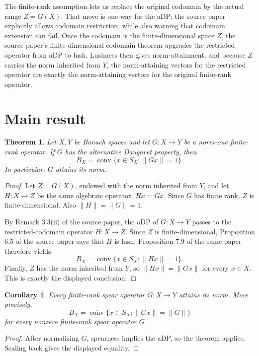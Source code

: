 \documentclass[11pt]{article}
\newtheorem{theorem}{Theorem}
\newtheorem{corollary}{Corollary}
\newcommand{\conv}{\operatorname{conv}}
\begin{document}
The finite-rank assumption lets us replace the original codomain by the
actual range \(Z=G(X)\).  That move is one-way for the aDP: the source
paper explicitly allows codomain restriction, while also warning that
codomain extension can fail.  Once the codomain is the finite-dimensional
space \(Z\), the source paper's finite-dimensional codomain theorem
upgrades the restricted operator from aDP to lush.  Lushness then gives
norm-attainment, and because \(Z\) carries the norm inherited from \(Y\),
the norm-attaining vectors for the restricted operator are exactly the
norm-attaining vectors for the original finite-rank operator.

\section*{Main result}

\begin{theorem}
Let \(X,Y\) be Banach spaces and let \(G:X\to Y\) be a norm-one
finite-rank operator.  If \(G\) has the alternative Daugavet property,
then
\[
  B_X=\overline{\conv}\{x\in S_X:\|Gx\|=1\}.
\]
In particular, \(G\) attains its norm.
\end{theorem}

\begin{proof}
Let \(Z=G(X)\), endowed with the norm inherited from \(Y\), and let
\(H:X\to Z\) be the same algebraic operator, \(Hx=Gx\).  Since \(G\)
has finite rank, \(Z\) is finite-dimensional.  Also \(\|H\|=\|G\|=1\).

By Remark 3.3(ii) of the source paper, the aDP of \(G:X\to Y\) passes
to the restricted-codomain operator \(H:X\to Z\).  Since \(Z\) is
finite-dimensional, Proposition 6.5 of the source paper says that
\(H\) is lush.  Proposition 7.9 of the same paper therefore yields
\[
  B_X=\overline{\conv}\{x\in S_X:\|Hx\|=1\}.
\]
Finally, \(Z\) has the norm inherited from \(Y\), so \(\|Hx\|=\|Gx\|\)
for every \(x\in X\).  This is exactly the displayed conclusion.
\end{proof}

\begin{corollary}
Every finite-rank spear operator \(G:X\to Y\) attains its norm.  More
precisely,
\[
  B_X=\overline{\conv}\{x\in S_X:\|Gx\|=\|G\|\}
\]
for every nonzero finite-rank spear operator \(G\).
\end{corollary}

\begin{proof}
After normalizing \(G\), spearness implies the aDP, so the theorem
applies.  Scaling back gives the displayed equality.
\end{proof}
\end{document}
